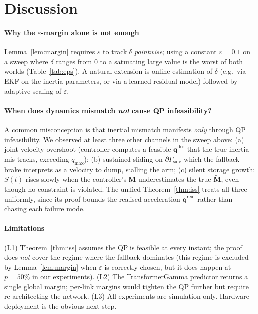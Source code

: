 \documentclass[10pt,conference]{IEEEtran}
\newcommand{\bddq}{\ddot{\bm{q}}}
\newcommand{\bM}{\bm{M}}
\newcommand{\bMt}{\widetilde{\bm{M}}}
\theoremstyle{remark}
\theoremstyle{plain}
\begin{document}
\section{Discussion}
\label{sec:discuss}

\paragraph*{Why the $\varepsilon$-margin alone is not enough}
Lemma~\ref{lem:margin} requires $\varepsilon$ to track $\delta$
\emph{pointwise}; using a constant $\varepsilon{=}0.1$ on a sweep
where $\delta$ ranges from $0$ to a saturating large value is the
worst of both worlds (Table~\ref{tab:eps}).
A natural extension is online estimation of $\delta$ (e.g.\ via
EKF on the inertia parameters, or via a learned residual model)
followed by adaptive scaling of $\varepsilon$.

\paragraph*{When does dynamics mismatch \emph{not} cause QP
infeasibility?} A common misconception is that inertial mismatch
manifests \emph{only} through QP infeasibility. We observed at
least three other channels in the sweep above:
(a) joint-velocity overshoot
(controller computes a feasible $\bddq^{\text{des}}$ that the true
inertia mis-tracks, exceeding $\dot q_{\max}$);
(b) sustained sliding on
$\partial\Gamma_\text{safe}$ which the
fallback brake interprets as a velocity to dump, stalling the arm;
(c) silent storage growth: $S(t)$ rises slowly when the
controller's $\bM$ underestimates the true $\bMt$, even though
no constraint is violated.
The unified Theorem~\ref{thm:iss} treats all three uniformly, since
its proof bounds the realised acceleration
$\bddq^{\text{real}}$ rather than chasing each failure mode.

\paragraph*{Limitations}
(L1) Theorem~\ref{thm:iss} assumes the QP is feasible at every
instant; the proof does \emph{not} cover the regime where the
fallback dominates (this regime is excluded by Lemma~\ref{lem:margin}
when $\varepsilon$ is correctly chosen, but it does happen at
$p{=}50\%$ in our experiments).
(L2) The TransformerGamma predictor returns a single global
margin; per-link margins would tighten the QP further but require
re-architecting the network.
(L3) All experiments are simulation-only.
Hardware deployment is the obvious next step.
\end{document}

